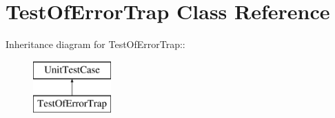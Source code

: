 \hypertarget{class_test_of_error_trap}{
\section{TestOfErrorTrap Class Reference}
\label{class_test_of_error_trap}
}
Inheritance diagram for TestOfErrorTrap::\begin{figure}[H]
\begin{center}
\leavevmode
\includegraphics[height=2cm]{class_test_of_error_trap}
\end{center}
\end{figure}
